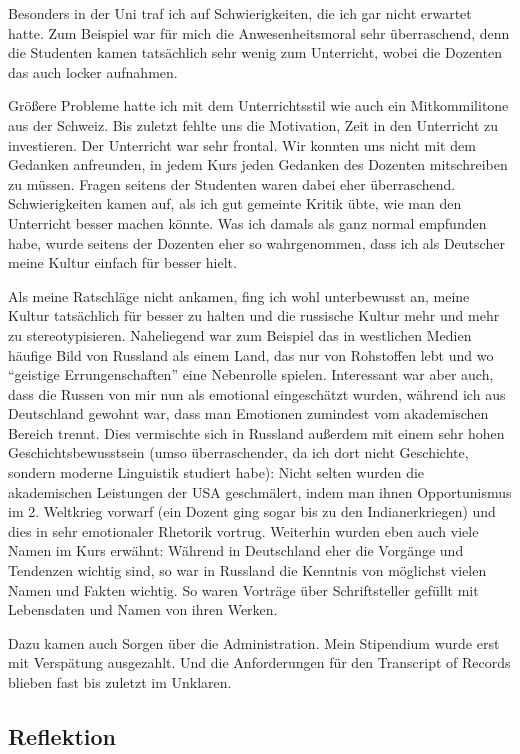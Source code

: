 \documentclass[12pt,headsepline,a4paper]{scrartcl}
\begin{document}
Besonders in der Uni traf ich auf Schwierigkeiten, die ich gar nicht erwartet hatte. Zum Beispiel war für mich die Anwesenheitsmoral sehr überraschend, denn die Studenten kamen tatsächlich sehr wenig zum Unterricht, wobei die Dozenten das auch locker aufnahmen.

Größere Probleme hatte ich mit dem Unterrichtsstil wie auch ein Mitkommilitone aus der Schweiz. Bis zuletzt fehlte uns die Motivation, Zeit in den Unterricht zu investieren. Der Unterricht war sehr frontal. Wir konnten uns nicht mit dem Gedanken anfreunden, in jedem Kurs jeden Gedanken des Dozenten mitschreiben zu müssen. Fragen seitens der Studenten waren dabei eher überraschend. Schwierigkeiten kamen auf, als ich gut gemeinte Kritik übte, wie man den Unterricht besser machen könnte. Was ich damals als ganz normal empfunden habe, wurde seitens der Dozenten eher so wahrgenommen, dass ich als Deutscher meine Kultur einfach für besser hielt.

Als meine Ratschläge nicht ankamen, fing ich wohl unterbewusst an, meine Kultur tatsächlich für besser zu halten und die russische Kultur mehr und mehr zu stereotypisieren. Naheliegend war zum Beispiel das in westlichen Medien häufige Bild von Russland als einem Land, das nur von Rohstoffen lebt und wo “geistige Errungenschaften” eine Nebenrolle spielen. Interessant war aber auch, dass die Russen von mir nun als emotional eingeschätzt wurden, während ich aus Deutschland gewohnt war, dass man Emotionen zumindest vom akademischen Bereich trennt. Dies vermischte sich in Russland außerdem mit einem sehr hohen Geschichtsbewusstsein (umso überraschender, da ich dort nicht Geschichte, sondern moderne Linguistik studiert habe): Nicht selten wurden die akademischen Leistungen der USA geschmälert, indem man ihnen Opportunismus im 2. Weltkrieg vorwarf (ein Dozent ging sogar bis zu den Indianerkriegen) und dies in sehr emotionaler Rhetorik vortrug. Weiterhin wurden eben auch viele Namen im Kurs erwähnt: Während in Deutschland eher die Vorgänge und Tendenzen wichtig sind, so war in Russland die Kenntnis von möglichst vielen Namen und Fakten wichtig. So waren Vorträge über Schriftsteller gefüllt mit Lebensdaten und Namen von ihren Werken.

Dazu kamen auch Sorgen über die Administration. Mein Stipendium wurde erst mit Verspätung ausgezahlt. Und die Anforderungen für den Transcript of Records blieben fast bis zuletzt im Unklaren.

\subsection*{Reflektion}
\end{document}
